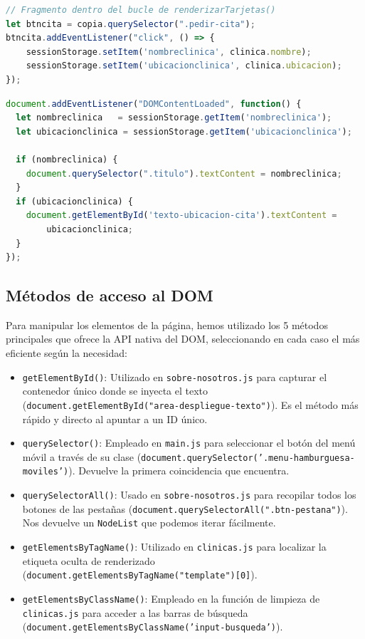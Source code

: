 \documentclass[11pt]{article}
\begin{document}
\begin{lstlisting}[language=JavaScript, caption=Guardado de estado en la generación de la tarjeta (clinicas.js)]
// Fragmento dentro del bucle de renderizarTarjetas()
let btncita = copia.querySelector(".pedir-cita");
btncita.addEventListener("click", () => {
    sessionStorage.setItem('nombreclinica', clinica.nombre);
    sessionStorage.setItem('ubicacionclinica', clinica.ubicacion);
});
\end{lstlisting}

\begin{lstlisting}[language=JavaScript, caption=Recuperación e inyección de datos en el iframe modal (pedir-cita.js)]
document.addEventListener("DOMContentLoaded", function() {
  let nombreclinica   = sessionStorage.getItem('nombreclinica');
  let ubicacionclinica = sessionStorage.getItem('ubicacionclinica');

  if (nombreclinica) {
    document.querySelector(".titulo").textContent = nombreclinica;
  }
  if (ubicacionclinica) {
    document.getElementById('texto-ubicacion-cita').textContent =
        ubicacionclinica;
  }
});
\end{lstlisting}

\clearpage

\subsection{Métodos de acceso al DOM}

Para manipular los elementos de la página, hemos utilizado los 5 métodos principales que ofrece la API nativa del DOM, seleccionando en cada caso el más eficiente según la necesidad:

\begin{itemize}
    \item \texttt{getElementById()}: Utilizado en \texttt{sobre-nosotros.js} para capturar el contenedor único donde se inyecta el texto (\texttt{document.getElementById("area-despliegue-texto")}). Es el método más rápido y directo al apuntar a un ID único.
    \item \texttt{querySelector()}: Empleado en \texttt{main.js} para seleccionar el botón del menú móvil a través de su clase (\texttt{document.querySelector('.menu-hamburguesa-moviles')}). Devuelve la primera coincidencia que encuentra.
    \item \texttt{querySelectorAll()}: Usado en \texttt{sobre-nosotros.js} para recopilar todos los botones de las pestañas (\texttt{document.querySelectorAll(".btn-pestana")}). Nos devuelve un \texttt{NodeList} que podemos iterar fácilmente.
    \item \texttt{getElementsByTagName()}: Utilizado en \texttt{clinicas.js} para localizar la etiqueta oculta de renderizado (\texttt{document.getElementsByTagName("template")[0]}).
    \item \texttt{getElementsByClassName()}: Empleado en la función de limpieza de \texttt{clinicas.js} para acceder a las barras de búsqueda (\texttt{document.getElementsByClassName('input-busqueda')}).
\end{itemize}
\end{document}
